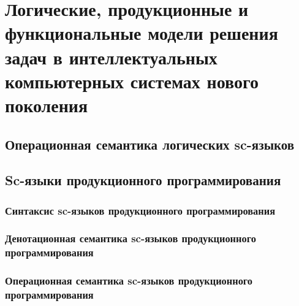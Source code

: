 \chapter{Логические, продукционные и функциональные модели решения задач в интеллектуальных компьютерных системах нового поколения}
\label{chapter_logic_productions}


\section{Операционная семантика логических sc-языков}
\section{Sc-языки продукционного программирования}
\subsection{Синтаксис sc-языков продукционного программирования}
\subsection{Денотационная семантика sc-языков продукционного программирования}
\subsection{Операционная семантика sc-языков продукционного программирования}

%